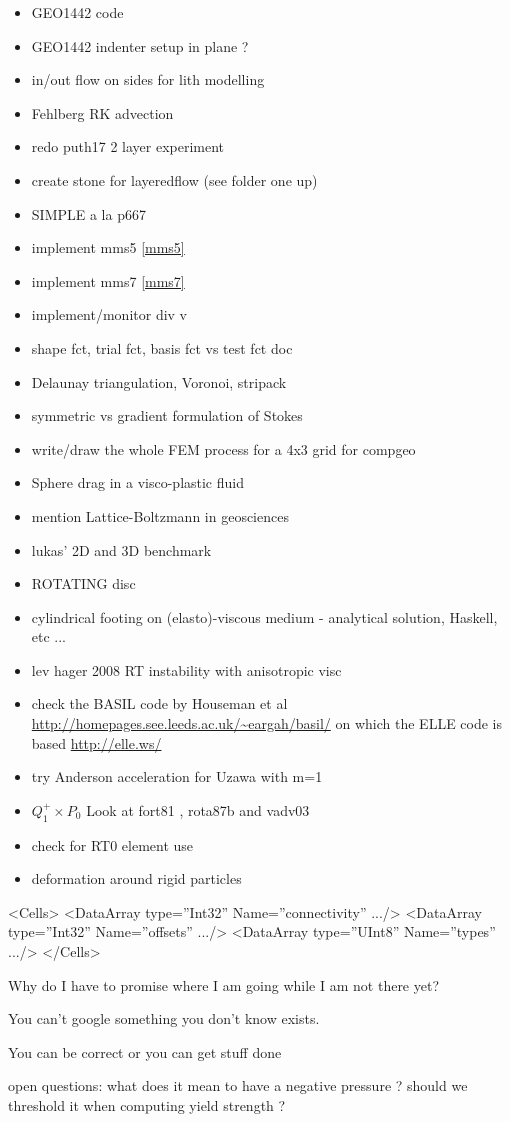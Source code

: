 \begin{itemize}
\item GEO1442 code 
\item GEO1442 indenter setup in plane ?
\item in/out flow on sides for lith modelling
\item Fehlberg RK advection
\item redo puth17 2 layer experiment
\item create stone for layeredflow (see folder one up)
\item SIMPLE a la p667 \cite{john16} 
\item implement mms5 \ref{mms5}
\item implement mms7 \ref{mms7}
\item implement/monitor div v
\item shape fct, trial fct, basis fct vs test fct doc
\item Delaunay triangulation, Voronoi, stripack
\item symmetric vs gradient formulation of Stokes
\item write/draw the whole FEM process for a 4x3 grid for compgeo
\item Sphere drag in a visco-plastic fluid \cite{bemj04}
\item mention Lattice-Boltzmann in geosciences \cite{hupc08}
\item lukas' 2D and 3D benchmark
\item ROTATING disc
\item cylindrical footing on (elasto)-viscous medium - analytical solution, Haskell, etc ...
\item lev hager 2008 RT instability with anisotropic visc
\item check the BASIL code by Houseman et al \url{http://homepages.see.leeds.ac.uk/~eargah/basil/}
on which the ELLE code is based \url{http://elle.ws/} 
\item try Anderson acceleration for Uzawa \cite{hoow17} with m=1
\item $Q_1^+ \times P_0$ Look at fort81 , rota87b and vadv03
\item check \cite{bufm19} for RT0 element use
\item deformation around rigid particles \cite{ilma93}
\end{itemize}

 <Cells>
      <DataArray type=”Int32” Name=”connectivity” .../>
      <DataArray type=”Int32” Name=”offsets” .../>
      <DataArray type=”UInt8” Name=”types” .../>
    </Cells>


Why do I have to promise where I am going while I am not there yet?

You can't google something you don't know exists.

You can be correct or you can get stuff done

open questions:
what does it mean to have a negative pressure ? should we threshold it when computing yield strength ? 
